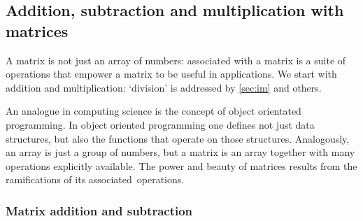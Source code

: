 \subsection{Addition, subtraction and multiplication with matrices}
\label{sec:amwm}

A matrix is not just an array of numbers: associated with a matrix is a suite of operations that empower a matrix to be useful in applications.
We start with addition and multiplication: `division' is addressed by \cref{sec:im} and others.

An analogue in computing science is the concept of object orientated programming.
In object oriented programming one defines not just data structures, but also the functions that operate on those structures.
Analogously, an array is just a group of numbers, but a matrix is an array together with many operations explicitly available. 
The power and beauty of matrices results from the ramifications of its associated~operations.


\subsubsection{Matrix addition and subtraction}

